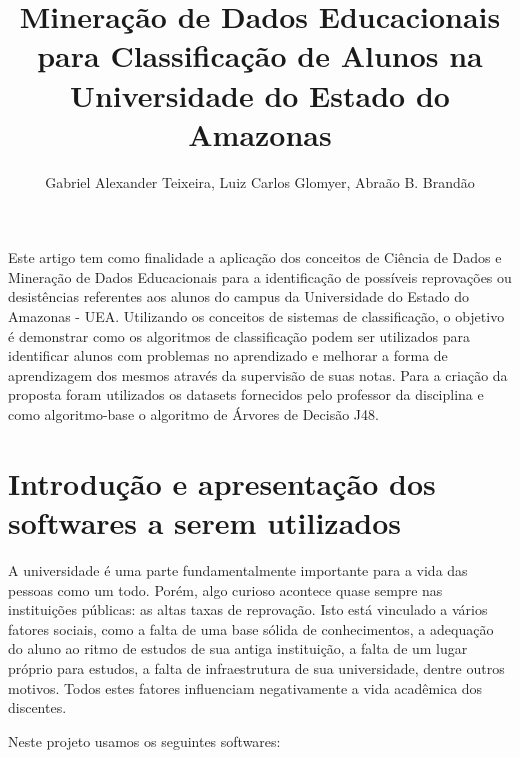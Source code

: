 \documentclass[12pt]{article}
\title{Mineração de Dados Educacionais para Classificação de Alunos na Universidade do Estado do Amazonas}
\author{Gabriel Alexander Teixeira, Luiz Carlos Glomyer, Abraão B. Brandão}
\begin{document}
 

\maketitle %

\begin{resumo} 
  Este artigo tem como finalidade a aplicação dos conceitos de Ciência de Dados e Mineração de Dados Educacionais para a identificação de possíveis reprovações ou desistências referentes aos alunos do campus da Universidade do Estado do Amazonas - UEA. Utilizando os conceitos de sistemas de classificação, o objetivo é demonstrar como os algoritmos de classificação podem ser utilizados para identificar alunos com problemas no aprendizado e melhorar a forma de aprendizagem dos mesmos através da supervisão de suas notas. Para a criação da proposta foram utilizados os datasets fornecidos pelo professor da disciplina e como algoritmo-base o algoritmo de Árvores de Decisão J48.
\end{resumo}
\section{Introdução e apresentação dos softwares a serem utilizados}

A universidade é uma parte fundamentalmente importante para a vida das pessoas como um todo. Porém, algo curioso acontece quase sempre nas instituições públicas: as altas taxas de reprovação. Isto está vinculado a vários fatores sociais, como a falta de uma base sólida de conhecimentos, a adequação do aluno ao ritmo de estudos de sua antiga instituição, a falta de um lugar próprio para estudos, a falta de infraestrutura de sua universidade, dentre outros motivos. Todos estes fatores influenciam negativamente a vida acadêmica dos discentes.


Neste projeto usamos os seguintes softwares:
\end{document}

